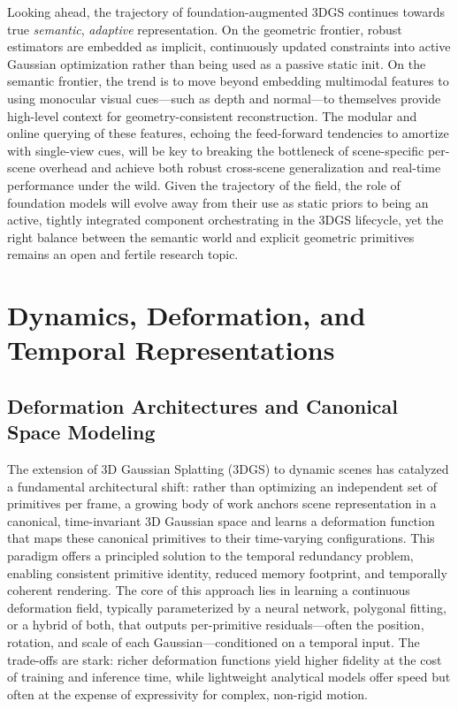 \documentclass[11pt,a4paper]{article}
\begin{document}
Looking ahead, the trajectory of foundation-augmented 3DGS continues towards true \emph{semantic}, \emph{adaptive} representation. On the geometric frontier, robust estimators are embedded as implicit, continuously updated constraints into active Gaussian optimization rather than being used as a passive static init. On the semantic frontier, the trend is to move beyond embedding multimodal features to using monocular visual cues---such as depth and normal---to themselves provide high-level context for geometry-consistent reconstruction. The modular and online querying of these features, echoing the feed-forward tendencies to amortize with single-view cues, will be key to breaking the bottleneck of scene-specific per-scene overhead and achieve both robust cross-scene generalization and real-time performance under the wild. Given the trajectory of the field, the role of foundation models will evolve away from their use as static priors to being an active, tightly integrated component orchestrating in the 3DGS lifecycle, yet the right balance between the semantic world and explicit geometric primitives remains an open and fertile research topic.


\section{Dynamics, Deformation, and Temporal Representations}



\subsection{Deformation Architectures and Canonical Space Modeling}


The extension of 3D Gaussian Splatting (3DGS) to dynamic scenes has catalyzed a fundamental architectural shift: rather than optimizing an independent set of primitives per frame, a growing body of work anchors scene representation in a canonical, time-invariant 3D Gaussian space and learns a deformation function that maps these canonical primitives to their time-varying configurations. This paradigm offers a principled solution to the temporal redundancy problem, enabling consistent primitive identity, reduced memory footprint, and temporally coherent rendering. The core of this approach lies in learning a continuous deformation field, typically parameterized by a neural network, polygonal fitting, or a hybrid of both, that outputs per-primitive residuals---often the position, rotation, and scale of each Gaussian---conditioned on a temporal input. The trade-offs are stark: richer deformation functions yield higher fidelity at the cost of training and inference time, while lightweight analytical models offer speed but often at the expense of expressivity for complex, non-rigid motion.
\end{document}
